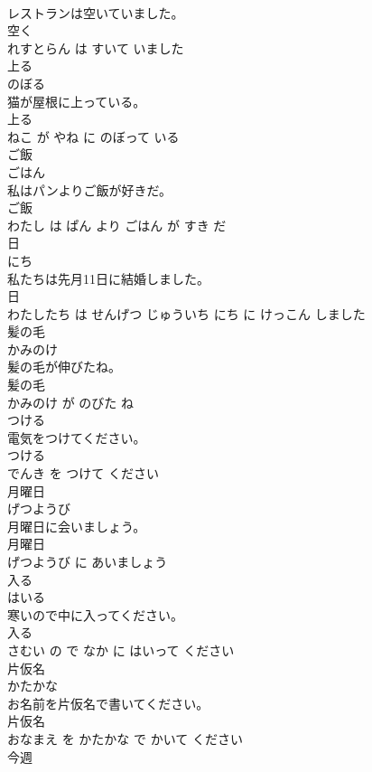 \documentclass[8pt]{extreport}
\begin{document}
\begin{CJK}{UTF8}{min}
\\	レストランは空いていました。	
\\	空く 
\\	れすとらん は すいて いました			
\\	上る	
\\	のぼる			
\\	猫が屋根に上っている。	
\\	上る 
\\	ねこ が やね に のぼって いる			
\\	ご飯	
\\	ごはん			
\\	私はパンよりご飯が好きだ。	
\\	ご飯 
\\	わたし は ぱん より ごはん が すき だ			
\\	日	
\\	にち			
\\	私たちは先月11日に結婚しました。	
\\	日 
\\	わたしたち は せんげつ じゅういち にち に けっこん しました			
\\	髪の毛	
\\	かみのけ			
\\	髪の毛が伸びたね。	
\\	髪の毛 
\\	かみのけ が のびた ね			
\\	つける	
\\	電気をつけてください。	
\\	つける 
\\	でんき を つけて ください			
\\	月曜日	
\\	げつようび			
\\	月曜日に会いましょう。	
\\	月曜日 
\\	げつようび に あいましょう			
\\	入る	
\\	はいる			
\\	寒いので中に入ってください。	
\\	入る 
\\	さむい の で なか に はいって ください			
\\	片仮名	
\\	かたかな			
\\	お名前を片仮名で書いてください。	
\\	片仮名 
\\	おなまえ を かたかな で かいて ください			
\\	今週	

\end{CJK}
\end{document}
